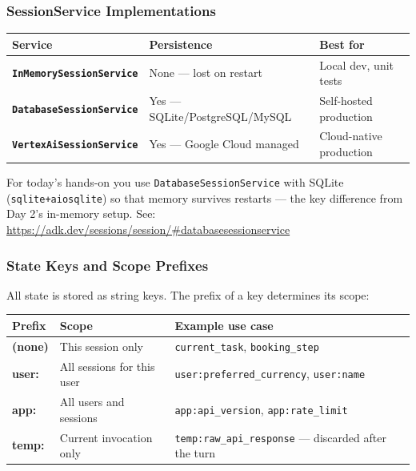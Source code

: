 \documentclass[12pt, a4paper]{article}
\begin{document}
\begin{theorybox}
\subsubsection*{SessionService Implementations}

\medskip
\begin{center}\small
\begin{tabular}{>{\bfseries}p{3.6cm} p{4cm} p{3.5cm}}
\toprule
\textbf{Service} & \textbf{Persistence} & \textbf{Best for} \\
\midrule
\texttt{InMemorySessionService} & None --- lost on restart & Local dev, unit tests \\
\addlinespace
\texttt{DatabaseSessionService} & Yes --- SQLite/PostgreSQL/MySQL & Self-hosted production \\
\addlinespace
\texttt{VertexAiSessionService} & Yes --- Google Cloud managed & Cloud-native production \\
\bottomrule
\end{tabular}
\end{center}
\medskip

\noindent For today's hands-on you use \texttt{DatabaseSessionService} with SQLite
(\texttt{sqlite+aiosqlite}) so that memory survives restarts --- the key difference
from Day 2's in-memory setup. See:
\url{https://adk.dev/sessions/session/\#databasesessionservice}

\subsubsection*{State Keys and Scope Prefixes}

All state is stored as string keys. The prefix of a key determines its scope:

\medskip
\begin{center}\small
\begin{tabular}{>{\ttfamily\bfseries}p{2.5cm} p{3.5cm} p{4.5cm}}
\toprule
\textbf{Prefix} & \textbf{Scope} & \textbf{Example use case} \\
\midrule
(none) & This session only & \texttt{current\_task}, \texttt{booking\_step} \\
\addlinespace
user: & All sessions for this user & \texttt{user:preferred\_currency}, \texttt{user:name} \\
\addlinespace
app: & All users and sessions & \texttt{app:api\_version}, \texttt{app:rate\_limit} \\
\addlinespace
temp: & Current invocation only & \texttt{temp:raw\_api\_response} --- discarded after the turn \\
\bottomrule
\end{tabular}
\end{center}
\medskip


\end{theorybox}
\end{document}
